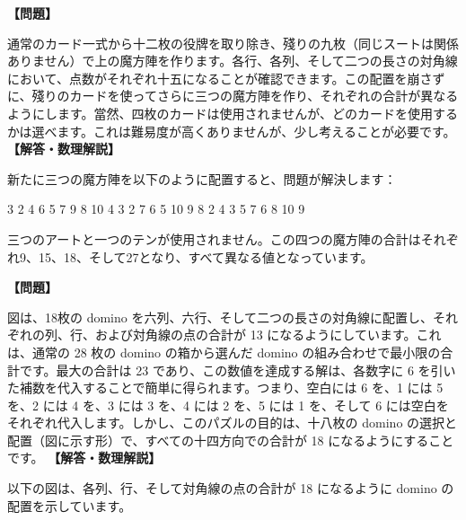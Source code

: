\documentclass[10pt,a4paper,oneside,openany]{ltjsbook}
\begin{document}
\begin{tcolorbox}[colback=softblue,colframe=primaryblue,title=\textbf{第 405 問：カードによる魔方陣 （原題: CARD MAGIC SQUARES.）},arc=2mm,boxrule=1pt,breakable]
\textbf{【問題】}\par\vspace{0.3em}
通常のカード一式から十二枚の役牌を取り除き、殘りの九枚（同じスートは関係ありません）で上の魔方陣を作ります。各行、各列、そして二つの長さの対角線において、点数がそれぞれ十五になることが確認できます。この配置を崩さずに、殘りのカードを使ってさらに三つの魔方陣を作り、それぞれの合計が異なるようにします。當然、四枚のカードは使用されませんが、どのカードを使用するかは選べます。これは難易度が高くありませんが、少し考えることが必要です。
\tcblower
\textbf{【解答・数理解説】}\par\vspace{0.3em}
新たに三つの魔方陣を以下のように配置すると、問題が解決します：

3 2 4      6 5 7    9 8 10
4 3 2      7 6 5   10 9  8
2 4 3      5 7 6    8 10 9

三つのアートと一つのテンが使用されません。この四つの魔方陣の合計はそれぞれ9、15、18、そして27となり、すべて異なる値となっています。
\end{tcolorbox}

\begin{tcolorbox}[colback=softblue,colframe=primaryblue,title=\textbf{第 406 問：十八枚の Domino の謎 （原題: THE EIGHTEEN DOMINOES.）},arc=2mm,boxrule=1pt,breakable]
\textbf{【問題】}\par\vspace{0.3em}
図は、18枚の domino を六列、六行、そして二つの長さの対角線に配置し、それぞれの列、行、および対角線の点の合計が 13 になるようにしています。これは、通常の 28 枚の domino の箱から選んだ domino の組み合わせで最小限の合計です。最大の合計は 23 であり、この数値を達成する解は、各数字に 6 を引いた補数を代入することで簡単に得られます。つまり、空白には 6 を、1 には 5 を、2 には 4 を、3 には 3 を、4 には 2 を、5 には 1 を、そして 6 には空白をそれぞれ代入します。しかし、このパズルの目的は、十八枚の domino の選択と配置（図に示す形）で、すべての十四方向での合計が 18 になるようにすることです。
\tcblower
\textbf{【解答・数理解説】}\par\vspace{0.3em}
以下の図は、各列、行、そして対角線の点の合計が 18 になるように domino の配置を示しています。
\end{tcolorbox}
\end{document}
